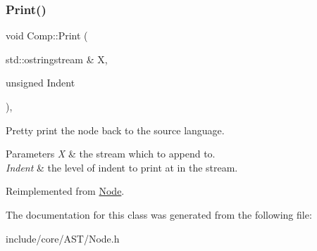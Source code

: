 \subsubsection{\texorpdfstring{Print()}{Print()}}
{\footnotesize\ttfamily void Comp\+::\+Print (\begin{DoxyParamCaption}\item[{std\+::ostringstream \&}]{X,  }\item[{unsigned}]{Indent }\end{DoxyParamCaption})\hspace{0.3cm}{\ttfamily [override]}, {\ttfamily [virtual]}}

Pretty print the node back to the source language. 
\begin{DoxyParams}{Parameters}
{\em X} & the stream which to append to. \\
\hline
{\em Indent} & the level of indent to print at in the stream. \\
\hline
\end{DoxyParams}


Reimplemented from \mbox{\hyperlink{class_node_a5325b760a6e6fe94227c0cff53af2c45}{Node}}.



The documentation for this class was generated from the following file\+:\begin{DoxyCompactItemize}
\item 
include/core/\+A\+S\+T/Node.\+h\end{DoxyCompactItemize}
